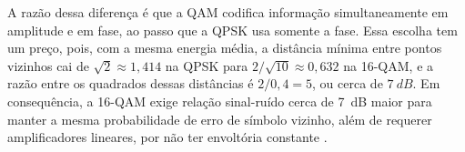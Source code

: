 A razão dessa diferença é que a QAM codifica informação simultaneamente em amplitude e em fase, ao passo que a QPSK usa somente a fase. Essa escolha tem um preço, pois, com a mesma energia média, a distância mínima entre pontos vizinhos cai de $\sqrt2\approx1{,}414$ na QPSK para $2/\sqrt{10}\approx0{,}632$ na 16-QAM, e a razão entre os quadrados dessas distâncias é $2/0{,}4=5$, ou cerca de $\SI{7}{dB}$. Em consequência, a 16-QAM exige relação sinal-ruído cerca de \SI{7}{dB} maior para manter a mesma probabilidade de erro de símbolo vizinho, além de requerer amplificadores lineares, por não ter envoltória constante \cite{sklar2001}.
